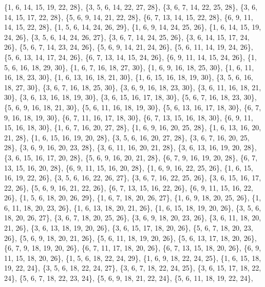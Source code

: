 \documentclass[11pt,a4paper]{article}
\begin{document}
{\{1, 6, 14, 15, 19, 22, 28\}, \{3, 5, 6, 14, 22, 27, 28\}, \{3, 6, 7, 14, 22, 25, 28\}, \{3, 6, 14, 15, 17, 22, 28\}, \{5, 6, 9, 14, 21, 22, 28\},
\{6, 7, 13, 14, 15, 22, 28\}, \{6, 9, 11, 14, 15, 22, 28\}, \{1, 5, 6, 14, 24, 26, 29\}, \{1, 6, 9, 14, 24, 25, 26\}, \{1, 6, 14, 15, 19, 24, 26\},
\{3, 5, 6, 14, 24, 26, 27\}, \{3, 6, 7, 14, 24, 25, 26\}, \{3, 6, 14, 15, 17, 24, 26\}, \{5, 6, 7, 14, 23, 24, 26\}, \{5, 6, 9, 14, 21, 24, 26\},
\{5, 6, 11, 14, 19, 24, 26\}, \{5, 6, 13, 14, 17, 24, 26\}, \{6, 7, 13, 14, 15, 24, 26\}, \{6, 9, 11, 14, 15, 24, 26\}, \{1, 5, 6, 16, 18, 29, 30\},
\{1, 6, 7, 16, 18, 27, 30\}, \{1, 6, 9, 16, 18, 25, 30\}, \{1, 6, 11, 16, 18, 23, 30\}, \{1, 6, 13, 16, 18, 21, 30\}, \{1, 6, 15, 16, 18, 19, 30\},
\{3, 5, 6, 16, 18, 27, 30\}, \{3, 6, 7, 16, 18, 25, 30\}, \{3, 6, 9, 16, 18, 23, 30\}, \{3, 6, 11, 16, 18, 21, 30\}, \{3, 6, 13, 16, 18, 19, 30\},
\{3, 6, 15, 16, 17, 18, 30\}, \{5, 6, 7, 16, 18, 23, 30\}, \{5, 6, 9, 16, 18, 21, 30\}, \{5, 6, 11, 16, 18, 19, 30\}, \{5, 6, 13, 16, 17, 18, 30\},
\{6, 7, 9, 16, 18, 19, 30\}, \{6, 7, 11, 16, 17, 18, 30\}, \{6, 7, 13, 15, 16, 18, 30\}, \{6, 9, 11, 15, 16, 18, 30\}, \{1, 6, 7, 16, 20, 27, 28\},
\{1, 6, 9, 16, 20, 25, 28\}, \{1, 6, 13, 16, 20, 21, 28\}, \{1, 6, 15, 16, 19, 20, 28\}, \{3, 5, 6, 16, 20, 27, 28\}, \{3, 6, 7, 16, 20, 25, 28\},
\{3, 6, 9, 16, 20, 23, 28\}, \{3, 6, 11, 16, 20, 21, 28\}, \{3, 6, 13, 16, 19, 20, 28\}, \{3, 6, 15, 16, 17, 20, 28\}, \{5, 6, 9, 16, 20, 21, 28\},
\{6, 7, 9, 16, 19, 20, 28\}, \{6, 7, 13, 15, 16, 20, 28\}, \{6, 9, 11, 15, 16, 20, 28\}, \{1, 6, 9, 16, 22, 25, 26\}, \{1, 6, 15, 16, 19, 22, 26\},
\{3, 5, 6, 16, 22, 26, 27\}, \{3, 6, 7, 16, 22, 25, 26\}, \{3, 6, 15, 16, 17, 22, 26\}, \{5, 6, 9, 16, 21, 22, 26\}, \{6, 7, 13, 15, 16, 22, 26\},
\{6, 9, 11, 15, 16, 22, 26\}, \{1, 5, 6, 18, 20, 26, 29\}, \{1, 6, 7, 18, 20, 26, 27\}, \{1, 6, 9, 18, 20, 25, 26\}, \{1, 6, 11, 18, 20, 23, 26\},
\{1, 6, 13, 18, 20, 21, 26\}, \{1, 6, 15, 18, 19, 20, 26\}, \{3, 5, 6, 18, 20, 26, 27\}, \{3, 6, 7, 18, 20, 25, 26\}, \{3, 6, 9, 18, 20, 23, 26\},
\{3, 6, 11, 18, 20, 21, 26\}, \{3, 6, 13, 18, 19, 20, 26\}, \{3, 6, 15, 17, 18, 20, 26\}, \{5, 6, 7, 18, 20, 23, 26\}, \{5, 6, 9, 18, 20, 21, 26\},
\{5, 6, 11, 18, 19, 20, 26\}, \{5, 6, 13, 17, 18, 20, 26\}, \{6, 7, 9, 18, 19, 20, 26\}, \{6, 7, 11, 17, 18, 20, 26\}, \{6, 7, 13, 15, 18, 20, 26\},
\{6, 9, 11, 15, 18, 20, 26\}, \{1, 5, 6, 18, 22, 24, 29\}, \{1, 6, 9, 18, 22, 24, 25\}, \{1, 6, 15, 18, 19, 22, 24\}, \{3, 5, 6, 18, 22, 24, 27\},
\{3, 6, 7, 18, 22, 24, 25\}, \{3, 6, 15, 17, 18, 22, 24\}, \{5, 6, 7, 18, 22, 23, 24\}, \{5, 6, 9, 18, 21, 22, 24\}, \{5, 6, 11, 18, 19, 22, 24\},
}
\end{document}
